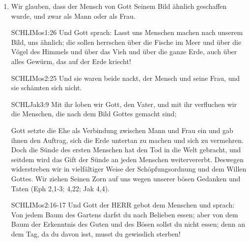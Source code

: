 \documentclass{../../inc/mybib}
\begin{document}
\begin{spacing}{1.5}
\begin{enumerate}
\begin{bibelbox}{SCHL}{Matt}{28:19}
    \end{bibelbox}
    \begin{bibelbox}{SCHL}{IKor}{12:4-6}
        Es bestehen aber Unterschiede in den Gnadengaben, doch es ist derselbe Geist; auch gibt es unterschiedliche Dienste, doch es ist derselbe Herr; und auch die Kraftwirkungen sind unterschiedlich, doch es ist derselbe Gott, der alles in allen wirkt.
    \end{bibelbox}
    \begin{bibelbox}{SCHL}{IIKor}{13:13}
        Die Gnade des Herrn Jesus Christus und die Liebe Gottes und die Gemeinschaft des Heiligen Geistes sei mit euch allen! Amen.
    \end{bibelbox}    
    \item {} Wir glauben, dass der Mensch von Gott Seinem Bild ähnlich geschaffen wurde, und zwar als Mann oder als Frau.
     \begin{bibelbox}{SCHL}{IMos}{1:26}
        Und Gott sprach: Lasst uns Menschen machen nach unserem Bild, uns ähnlich; die sollen herrschen über die Fische im Meer und über die Vögel des Himmels und über das Vieh und über die ganze Erde, auch über alles Gewürm, das auf der Erde kriecht!
    \end{bibelbox}
     \begin{bibelbox}{SCHL}{IMos}{2:25}
        Und sie waren beide nackt, der Mensch und seine Frau, und sie schämten sich nicht.
    \end{bibelbox}
     \begin{bibelbox}{SCHL}{Jak}{3:9}
        Mit ihr loben wir Gott, den Vater, und mit ihr verfluchen wir die Menschen, die nach dem Bild Gottes gemacht sind; 
    \end{bibelbox}
    Gott setzte die Ehe als Verbindung zwischen Mann und Frau ein und gab ihnen den Auftrag, sich die Erde untertan zu machen und sich zu vermehren. Doch die Sünde des ersten Menschen hat den Tod in die Welt gebracht, und seitdem wird das Gift der Sünde an jeden Menschen weitervererbt. Deswegen widerstreben wir in vielfältiger Weise der Schöpfungsordnung und dem Willen Gottes. Wir ziehen Seinen Zorn auf uns wegen unserer bösen Gedanken und Taten (Eph 2,1-3; 4,22; Jak 4,4).
     \begin{bibelbox}{SCHL}{IMos}{2:16-17}
        Und Gott der HERR gebot dem Menschen und sprach: Von jedem Baum des Gartens darfst du nach Belieben essen; aber von dem Baum der Erkenntnis des Guten und des Bösen sollst du nicht essen; denn an dem Tag, da du davon isst, musst du gewisslich sterben!

\end{bibelbox}
\end{enumerate}
\end{spacing}
\end{document}
